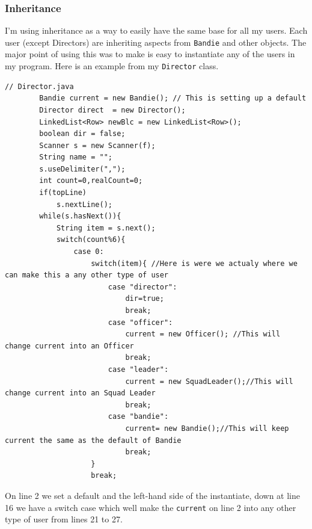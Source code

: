 \documentclass{article}
\begin{document}
\subsubsection{Inheritance}
I'm using inheritance as a way to easily have the same base for all my users. Each user (except Directors) are inheriting aspects from \verb|Bandie| and other objects. The major point of using this was to make is easy to instantiate any of the users in my program. Here is an example from my \verb|Director| class.
\begin{lstlisting}
// Director.java
		Bandie current = new Bandie(); // This is setting up a default
		Director direct  = new Director();
		LinkedList<Row> newBlc = new LinkedList<Row>();
		boolean dir = false;
		Scanner s = new Scanner(f);
		String name = "";
		s.useDelimiter(",");
		int count=0,realCount=0;
		if(topLine)
			s.nextLine();
		while(s.hasNext()){
			String item = s.next();
			switch(count%6){
				case 0:
					switch(item){ //Here is were we actualy where we can make this a any other type of user
						case "director":
							dir=true;
							break;
						case "officer":
							current = new Officer(); //This will change current into an Officer
							break;
						case "leader":
							current = new SquadLeader();//This will change current into an Squad Leader
							break;
						case "bandie":
							current= new Bandie();//This will keep current the same as the default of Bandie
							break;
					}
					break;
\end{lstlisting}
On line 2 we set a default and the left-hand side of the instantiate, down at line 16 we have a switch case which well make the \verb|current| on line 2 into any other type of user from lines 21 to 27. 
\end{document}
